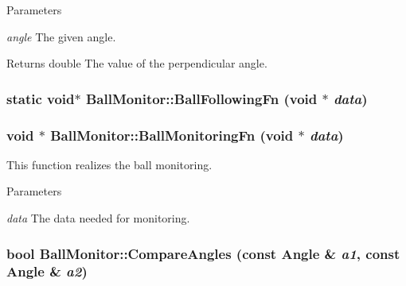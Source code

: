 \begin{DoxyParams}{Parameters}
\item[{\em angle}]The given angle. \end{DoxyParams}
\begin{DoxyReturn}{Returns}
double The value of the perpendicular angle. 
\end{DoxyReturn}
\hypertarget{classBallMonitor_a2ca3e25f437b5aabb3bc88e0f84cf9a5}{
\subsubsection[{BallFollowingFn}]{\setlength{\rightskip}{0pt plus 5cm}static void$\ast$ BallMonitor::BallFollowingFn (void $\ast$ {\em data})}}
\label{classBallMonitor_a2ca3e25f437b5aabb3bc88e0f84cf9a5}
\hypertarget{classBallMonitor_af76da8bc13e92d9083a9a77469c472df}{
\subsubsection[{BallMonitoringFn}]{\setlength{\rightskip}{0pt plus 5cm}void $\ast$ BallMonitor::BallMonitoringFn (void $\ast$ {\em data})}}
\label{classBallMonitor_af76da8bc13e92d9083a9a77469c472df}


This function realizes the ball monitoring. 


\begin{DoxyParams}{Parameters}
\item[{\em data}]The data needed for monitoring. \end{DoxyParams}
\hypertarget{classBallMonitor_a78114ec7fc20317f84491e428dd8c126}{
\subsubsection[{CompareAngles}]{\setlength{\rightskip}{0pt plus 5cm}bool BallMonitor::CompareAngles (const {\bf Angle} \& {\em a1}, \/  const {\bf Angle} \& {\em a2})}}
\label{classBallMonitor_a78114ec7fc20317f84491e428dd8c126}


